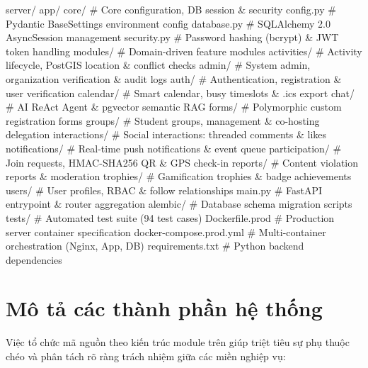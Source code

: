 \begin{mycode}{}
server/
    app/
        core/               # Core configuration, DB session & security
            config.py       # Pydantic BaseSettings environment config
            database.py     # SQLAlchemy 2.0 AsyncSession management
            security.py     # Password hashing (bcrypt) & JWT token handling
        modules/            # Domain-driven feature modules
            activities/     # Activity lifecycle, PostGIS location & conflict checks
            admin/          # System admin, organization verification & audit logs
            auth/           # Authentication, registration & user verification
            calendar/       # Smart calendar, busy timeslots & .ics export
            chat/           # AI ReAct Agent & pgvector semantic RAG
            forms/          # Polymorphic custom registration forms
            groups/         # Student groups, management & co-hosting delegation
            interactions/   # Social interactions: threaded comments & likes
            notifications/  # Real-time push notifications & event queue
            participation/  # Join requests, HMAC-SHA256 QR & GPS check-in
            reports/        # Content violation reports & moderation
            trophies/       # Gamification trophies & badge achievements
            users/          # User profiles, RBAC & follow relationships
        main.py             # FastAPI entrypoint & router aggregation
    alembic/                # Database schema migration scripts
    tests/                  # Automated test suite (94 test cases)
    Dockerfile.prod         # Production server container specification
    docker-compose.prod.yml # Multi-container orchestration (Nginx, App, DB)
    requirements.txt        # Python backend dependencies
\end{mycode}

\section{Mô tả các thành phần hệ thống}
Việc tổ chức mã nguồn theo kiến trúc module trên giúp triệt tiêu sự phụ thuộc chéo và phân tách rõ ràng trách nhiệm giữa các miền nghiệp vụ:

